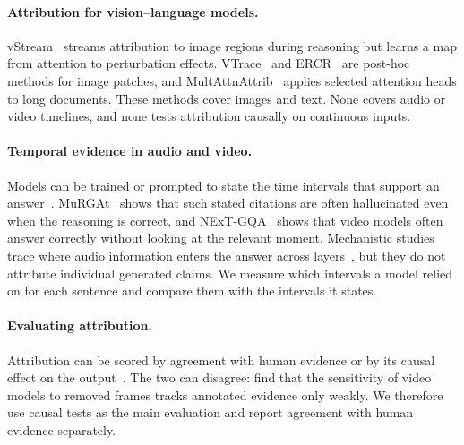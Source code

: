 \paragraph{Attribution for vision--language models.}
vStream~\cite{kang2026vstream} streams attribution to image regions during reasoning but learns a map from attention to perturbation effects. VTrace~\cite{yuan2026vtrace} and ERCR~\cite{liang2025ercr} are post-hoc methods for image patches, and MultAttnAttrib~\cite{tran2026multattnattrib} applies selected attention heads to long documents.
These methods cover images and text. None covers audio or video timelines, and none tests attribution causally on continuous inputs.

\paragraph{Temporal evidence in audio and video.}
Models can be trained or prompted to state the time intervals that support an answer~\cite{lu2025vited, wang2025groundedvideollm, zhu2026timelens2}.
MuRGAt~\cite{wan2026murgat} shows that such stated citations are often hallucinated even when the reasoning is correct, and NExT-GQA~\cite{xiao2024nextgqa} shows that video models often answer correctly without looking at the relevant moment.
Mechanistic studies trace where audio information enters the answer across layers~\cite{cho2026tracingaudio, chen2026causalaudio}, but they do not attribute individual generated claims.
We measure which intervals a model relied on for each sentence and compare them with the intervals it states.

\paragraph{Evaluating attribution.}
Attribution can be scored by agreement with human evidence or by its causal effect on the output~\cite{deyoung2020eraser, atanasova-etal-2020-diagnostic}. The two can disagree: \citet{alhamidi2026carve} find that the sensitivity of video models to removed frames tracks annotated evidence only weakly.
We therefore use causal tests as the main evaluation and report agreement with human evidence separately.
